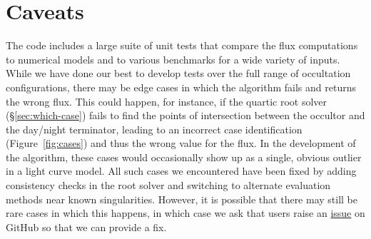 \documentclass[modern]{aastex62}
\begin{document}
\section{Caveats}
\label{sec:cases-missing}
%
The \starry code includes a large suite of unit tests that compare
the flux computations to numerical models and to various benchmarks
for a wide variety of inputs. While we have done our best to
develop tests over the full range of occultation configurations,
there may be edge cases in which the \starry algorithm fails and returns
the wrong flux. This could happen, for instance, if the quartic root
solver (\S\ref{sec:which-case}) fails to find the points of intersection
between the occultor and the day/night terminator, leading to
an incorrect case identification (Figure~\ref{fig:cases}) and thus the
wrong value for the flux. In the development of the algorithm, these cases
would occasionally show up as a single, obvious outlier in a light curve
model. All such cases we encountered
have been fixed by adding consistency
checks in the root solver and switching to alternate evaluation methods
near known singularities. However, it is possible that there may still be
rare cases in which this happens, in which case we ask that users
raise an \href{https://github.com/rodluger/starry/issues}{issue} on
GitHub so that we can provide a fix.


\vfill
\pagebreak

\end{document}
